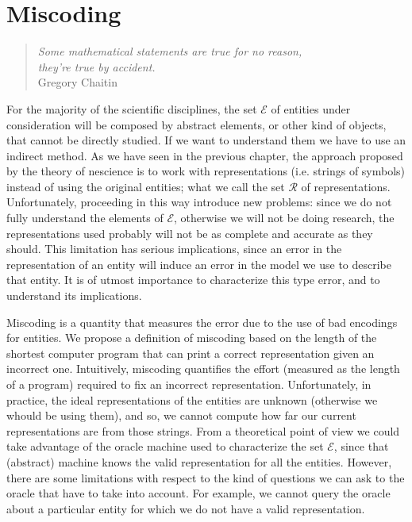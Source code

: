 %
%


\chapter{Miscoding}
\label{chap:Miscoding}

\begin{quote}
\begin{flushright}
\emph{Some mathematical statements are true for no reason,\\
they're true by accident.}\\
Gregory Chaitin
\end{flushright}
\end{quote}
\bigskip

For the majority of the scientific disciplines, the set $\mathcal{E}$ of entities under consideration will be composed by abstract elements, or other kind of objects, that cannot be directly studied. If we want to understand them we have to use an indirect method. As we have seen in the previous chapter, the approach proposed by the theory of nescience is to work with representations (i.e. strings of symbols) instead of using the original entities; what we call the set $\mathcal{R}$ of representations. Unfortunately, proceeding in this way introduce new problems: since we do not fully understand the elements of $\mathcal{E}$, otherwise we will not be doing research, the representations used probably will not be as complete and accurate as they should. This limitation has serious implications, since an error in the representation of an entity will induce an error in the model we use to describe that entity. It is of utmost importance to characterize this type error, and to understand its implications.

Miscoding is a quantity that measures the error due to the use of bad encodings for entities. We propose a definition of miscoding based on the length of the shortest computer program that can print a correct representation given an incorrect one. Intuitively, miscoding quantifies the effort (measured as the length of a program) required to fix an incorrect representation. Unfortunately, in practice, the ideal representations of the entities are unknown (otherwise we whould be using them), and so, we cannot compute how far our current representations are from those strings. From a theoretical point of view we could take advantage of the oracle machine used to characterize the set $\mathcal{E}$, since that (abstract) machine knows the valid representation for all the entities. However, there are some limitations with respect to the kind of questions we can ask to the oracle that have to take into account. For example, we cannot query the oracle about a particular entity for which we do not have a valid representation.

